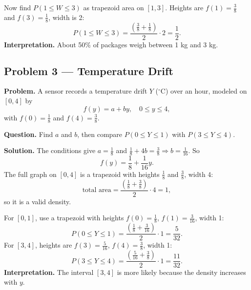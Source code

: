 \begin{ExamProblems}
		Now find \(P(1\le W\le 3)\) as trapezoid area on \([1,3]\).
		Heights are \(f(1)=\frac{3}{8}\) and \(f(3)=\frac{1}{8}\), width is 2:
		\[
		P(1\le W\le 3)=\frac{\left(\frac{3}{8}+\frac{1}{8}\right)}{2}\cdot 2=\frac{1}{2}.
		\]
		\textbf{Interpretation.} About 50\% of packages weigh between 1 kg and 3 kg.
		
		
		\hypertarget{c3-ex3}{}
		\item
		\subsection*{Problem 3 — Temperature Drift}
		
		\textbf{Problem.}
		A sensor records a temperature drift \(Y\) (\(^\circ\)C) over an hour, modeled on \([0,4]\) by
		\[
		f(y)=a+by,\quad 0\le y\le 4,
		\]
		with \(f(0)=\frac{1}{8}\) and \(f(4)=\frac{3}{8}\).
		
		\textbf{Question.} Find \(a\) and \(b\), then compare \(P(0\le Y\le 1)\) with \(P(3\le Y\le 4)\).
		
		\textbf{Solution.}
		The conditions give \(a=\frac{1}{8}\) and \(\frac{1}{8}+4b=\frac{3}{8}\Rightarrow b=\frac{1}{16}\).
		So
		\[
		f(y)=\frac{1}{8}+\frac{1}{16}y.
		\]
		The full graph on \([0,4]\) is a trapezoid with heights \(\frac{1}{8}\) and \(\frac{3}{8}\), width 4:
		\[
		\text{total area}=\frac{\left(\frac{1}{8}+\frac{3}{8}\right)}{2}\cdot 4=1,
		\]
		so it is a valid density.
		
		For \([0,1]\), use a trapezoid with heights \(f(0)=\frac{1}{8}\), \(f(1)=\frac{3}{16}\), width 1:
		\[
		P(0\le Y\le 1)=\frac{\left(\frac{1}{8}+\frac{3}{16}\right)}{2}\cdot 1=\frac{5}{32}.
		\]
		For \([3,4]\), heights are \(f(3)=\frac{5}{16}\), \(f(4)=\frac{3}{8}\), width 1:
		\[
		P(3\le Y\le 4)=\frac{\left(\frac{5}{16}+\frac{3}{8}\right)}{2}\cdot 1=\frac{11}{32}.
		\]
		\textbf{Interpretation.} The interval \([3,4]\) is more likely because the density increases with \(y\).
		
	\end{ExamProblems}
	
	
